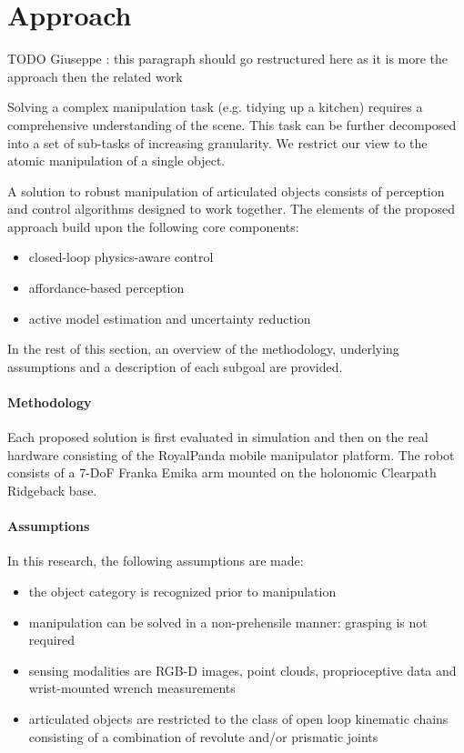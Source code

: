 \section{Approach}
\label{sec:Approach}

TODO Giuseppe : this paragraph should go restructured here as it is more the approach then the related work

Solving a complex manipulation task (e.g. tidying up a kitchen) requires a comprehensive understanding of the scene. This task can be further decomposed into a set of sub-tasks of increasing granularity. We restrict our view to the atomic manipulation of a single object.

A solution to robust manipulation of articulated objects consists of perception and control algorithms designed to work together. The elements of the proposed approach build upon the following core components:
\begin{itemize}
\item closed-loop physics-aware control
\item affordance-based perception
\item active model estimation and uncertainty reduction
\end{itemize}
In the rest of this section, an overview of the methodology, underlying assumptions and a description of each subgoal are provided. 

\paragraph{Methodology} Each proposed solution is first evaluated in simulation and then on the real hardware consisting of the RoyalPanda mobile manipulator platform. The robot consists of a 7-DoF Franka Emika arm mounted on the holonomic Clearpath Ridgeback base. 

\paragraph{Assumptions} In this research, the following assumptions are made:
\begin{itemize}
\item the object category is recognized prior to manipulation
\item manipulation can be solved in a non-prehensile manner: grasping is not required
\item sensing modalities are RGB-D images, point clouds, proprioceptive data and wrist-mounted wrench measurements 
\item articulated objects are restricted to the class of open loop kinematic chains consisting of a combination of revolute and/or prismatic joints
\end{itemize} 

